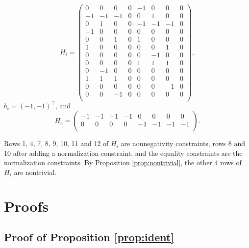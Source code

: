 \documentclass[12pt]{article}
\begin{document}
\[
H_i = \begin{pmatrix}
0 & 0 & 0 & 0 & -1 & 0 & 0 & 0 \\
 -1 & -1 & -1 & 0 & 0 & 1 & 0 & 0 \\
 0 & 1 & 0 & 0 & -1 & -1 & -1 & 0 \\
 -1 & 0 & 0 & 0 & 0 & 0 & 0 & 0 \\
 0 & 0 & 1 & 0 & 1 & 0 & 0 & 0 \\
 1 & 0 & 0 & 0 & 0 & 0 & 1 & 0 \\
 0 & 0 & 0 & 0 & 0 & -1 & 0 & 0 \\
 0 & 0 & 0 & 0 & 1 & 1 & 1 & 0 \\
 0 & -1 & 0 & 0 & 0 & 0 & 0 & 0 \\
 1 & 1 & 1 & 0 & 0 & 0 & 0 & 0 \\
 0 & 0 & 0 & 0 & 0 & 0 & -1 & 0 \\
 0 & 0 & -1 & 0 & 0 & 0 & 0 & 0 \\
\end{pmatrix},
\]
$b_e = (-1, -1)^\top$, and 
\[
H_e = \begin{pmatrix}
 -1 & -1 & -1 & -1 & 0 & 0 & 0 & 0 \\
 0 & 0 & 0 & 0 & -1 & -1 & -1 & -1 \\
\end{pmatrix}.
\]

Rows 1, 4, 7, 8, 9, 10, 11 and 12 of $H_i$ are nonnegativity constraints, rows 8 and 10 after adding a normalization constraint, and the equality constraints are the normalization constraints. By Proposition \ref{prop:nontrivial}, the other 4 rows of $H_i$ are nontrivial.


\section{Proofs} \label{appendix:proofs}
\subsection*{Proof of Proposition \ref{prop:ident}}
\end{document}
